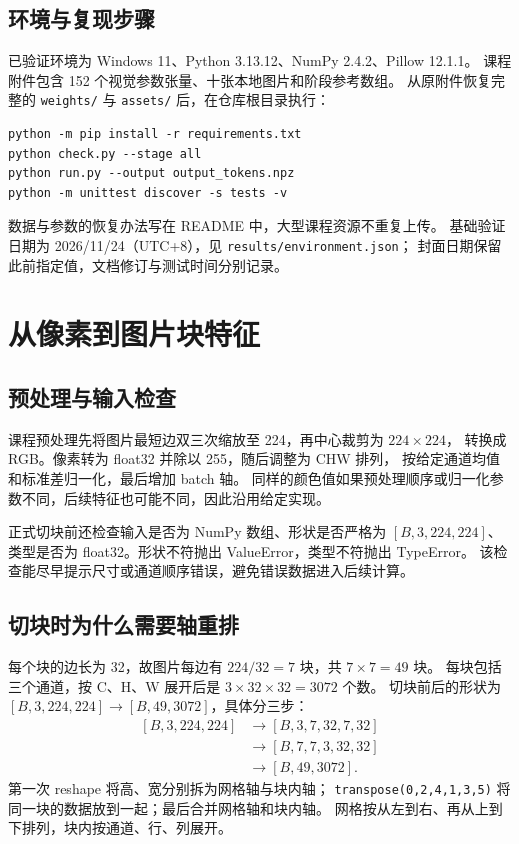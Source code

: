 \documentclass[a4paper,12pt]{article}
\begin{document}
\subsection{环境与复现步骤}
已验证环境为 Windows 11、Python 3.13.12、NumPy 2.4.2、Pillow 12.1.1。
课程附件包含 152 个视觉参数张量、十张本地图片和阶段参考数组。
从原附件恢复完整的 \texttt{weights/} 与 \texttt{assets/} 后，在仓库根目录执行：
\begin{verbatim}
python -m pip install -r requirements.txt
python check.py --stage all
python run.py --output output_tokens.npz
python -m unittest discover -s tests -v
\end{verbatim}
数据与参数的恢复办法写在 README 中，大型课程资源不重复上传。
基础验证日期为 2026/11/24（UTC+8），见 \texttt{results/environment.json}；
封面日期保留此前指定值，文档修订与测试时间分别记录。

\clearpage
\section{从像素到图片块特征}
\subsection{预处理与输入检查}
课程预处理先将图片最短边双三次缩放至 224，再中心裁剪为 $224\times224$，
转换成 RGB。像素转为 float32 并除以 255，随后调整为 CHW 排列，
按给定通道均值和标准差归一化，最后增加 batch 轴。
同样的颜色值如果预处理顺序或归一化参数不同，后续特征也可能不同，因此沿用给定实现。

正式切块前还检查输入是否为 NumPy 数组、形状是否严格为 $[B,3,224,224]$、
类型是否为 float32。形状不符抛出 ValueError，类型不符抛出 TypeError。
该检查能尽早提示尺寸或通道顺序错误，避免错误数据进入后续计算。

\subsection{切块时为什么需要轴重排}
每个块的边长为 32，故图片每边有 $224/32=7$ 块，共 $7\times7=49$ 块。
每块包括三个通道，按 C、H、W 展开后是 $3\times32\times32=3072$ 个数。
切块前后的形状为 $[B,3,224,224]\to[B,49,3072]$，具体分三步：
\[
\begin{aligned}
[B,3,224,224]&\longrightarrow[B,3,7,32,7,32]\\
&\longrightarrow[B,7,7,3,32,32]\\
&\longrightarrow[B,49,3072].
\end{aligned}
\]
第一次 reshape 将高、宽分别拆为网格轴与块内轴；
\texttt{transpose(0,2,4,1,3,5)} 将同一块的数据放到一起；最后合并网格轴和块内轴。
网格按从左到右、再从上到下排列，块内按通道、行、列展开。
\end{document}
